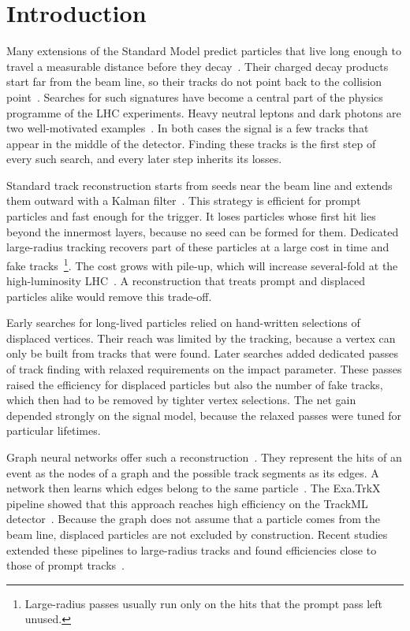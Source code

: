\section{Introduction}
\label{sec:intro}

Many extensions of the Standard Model predict particles that live long enough to travel a measurable distance before they decay~\cite{Dubois2008LLP,Vargas2024HNL}.
Their charged decay products start far from the beam line, so their tracks do not point back to the collision point~\cite{Kowalski2013Displaced}.
Searches for such signatures have become a central part of the physics programme of the LHC experiments.
Heavy neutral leptons and dark photons are two well-motivated examples~\cite{Vargas2024HNL,Chen2012DarkPhoton}.
In both cases the signal is a few tracks that appear in the middle of the detector.
Finding these tracks is the first step of every such search, and every later step inherits its losses.

Standard track reconstruction starts from seeds near the beam line and extends them outward with a Kalman filter~\cite{Hansen2014Kalman,Okafor2019Combinatorial}.
This strategy is efficient for prompt particles and fast enough for the trigger.
It loses particles whose first hit lies beyond the innermost layers, because no seed can be formed for them.
Dedicated large-radius tracking recovers part of these particles at a large cost in time and fake tracks~\cite{Rossi2018LRT}\footnote{Large-radius passes usually run only on the hits that the prompt pass left unused.}.
The cost grows with pile-up, which will increase several-fold at the high-luminosity LHC~\cite{Jensen2017Pileup,Okafor2013Upgrade}.
A reconstruction that treats prompt and displaced particles alike would remove this trade-off.

Early searches for long-lived particles relied on hand-written selections of displaced vertices.
Their reach was limited by the tracking, because a vertex can only be built from tracks that were found.
Later searches added dedicated passes of track finding with relaxed requirements on the impact parameter.
These passes raised the efficiency for displaced particles but also the number of fake tracks, which then had to be removed by tighter vertex selections.
The net gain depended strongly on the signal model, because the relaxed passes were tuned for particular lifetimes.

Graph neural networks offer such a reconstruction~\cite{Moreau2016GNNReview}.
They represent the hits of an event as the nodes of a graph and the possible track segments as its edges.
A network then learns which edges belong to the same particle~\cite{Fischer2011Interaction,Lindqvist2020MessagePassing}.
The Exa.TrkX pipeline showed that this approach reaches high efficiency on the TrackML detector~\cite{Yilmaz2023ExaTrkX,Tanaka2021TrackML}.
Because the graph does not assume that a particle comes from the beam line, displaced particles are not excluded by construction.
Recent studies extended these pipelines to large-radius tracks and found efficiencies close to those of prompt tracks~\cite{Sato2008EdgeClass,Zhang2013Metric}.

